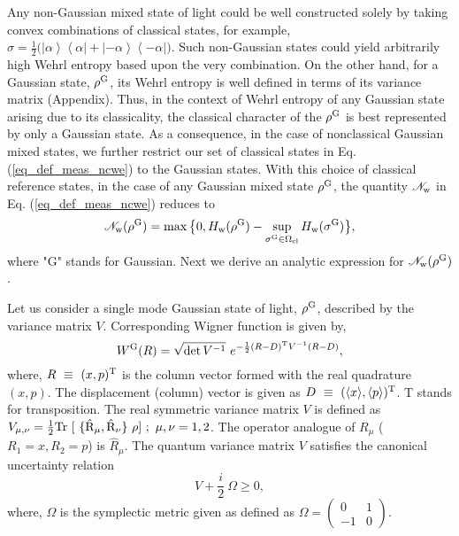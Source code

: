\documentclass[letter,scriptaddress,twocolumn,prl,showkeys]{revtex4}
\newcommand{\ket}[1]{\left| #1 \right\rangle}
\newcommand{\bra}[1]{\left\langle #1 \right|}
\begin{document}
Any non-Gaussian mixed state of light could be well constructed solely by taking convex combinations of classical states, for example, $\sigma=\frac{1}{2}\big(\ket\alpha\bra\alpha+\ket {-\alpha}\bra {-\alpha}\big)$. 
Such non-Gaussian states could yield arbitrarily high Wehrl entropy based upon the very combination. 
On the other hand, for a Gaussian state, $\rho^{\rm{G}}$, its Wehrl entropy is well defined in terms of its variance matrix (Appendix). 
Thus, in the context of Wehrl entropy of any Gaussian state arising due to its classicality, the classical character of the $\rho^{\rm{G}}$ is best represented by only a Gaussian state. 
As a consequence, in the case of nonclassical Gaussian mixed states, we further restrict our set of classical states in Eq. (\ref{eq_def_meas_ncwe}) to the Gaussian states. 
With this choice of classical reference states, in the case of any Gaussian mixed state $\rho^{\rm{G}}$, the quantity $\mathscr{N}_{\rm{w}}$ in Eq. (\ref{eq_def_meas_ncwe}) reduces to
\begin{equation}
\mathscr{N}_{\rm{w}}(\rho^{\rm{G}})=\max\big\lbrace 0,H_{\rm{w}}(\rho^{\rm{G}})-\sup_{\sigma^{\rm{G}}\in\Omega_{\rm{cl}}}H_{\rm{w}}(\sigma^{\rm{G}})\big\rbrace,
\label{eq_def_meas_ncwe_gauss}
\end{equation}
where "G" stands for Gaussian. 
Next we derive an analytic expression for $\mathscr{N}_{\rm{w}}(\rho^{\rm{G}})$.

Let us consider a single mode Gaussian state of light, $\rho^{\rm{G}}$, described by the variance matrix $V$. 
Corresponding Wigner function is given by,
\begin{equation}
W^{\rm{G}}(R)=\sqrt{\det V^{-1}}~e^{-\frac{1}{2}(R-D)^{\rm{T}}V^{-1}(R-D)},
\label{eq_def_wig_gauss}
\end{equation}
where, $R~\equiv~(x,p)^{\rm{T}}$ is the column vector formed with the real quadrature $(x,p)$. 
The displacement (column) vector is given as $D~\equiv~ (\langle x\rangle,\langle p\rangle)^{\rm{T}}$.
T stands for transposition.
The real symmetric variance matrix $V$ is defined as $V_{\mu,\nu}=\frac{1}{2}\rm{Tr}~[~\lbrace \hat{R}_{\mu},\hat{R}_{\nu}\rbrace~ \rho]~;~\mu,\nu=1,2$.
The operator analogue of $R_{\mu}$ ($R_{1}=x,R_{2}=p$) is $\hat{R}_{\mu}$.
The quantum variance matrix $V$ satisfies the canonical uncertainty relation \cite{varmat_simon}
\begin{equation}
V + \frac{i}{2}~\Omega\geq 0,
\label{eq_vm_cond_bonafide}
\end{equation}
where, $\Omega$ is the symplectic metric given as
defined as $\Omega=\begin{pmatrix}
0 & 1\\
-1 & 0
\end{pmatrix}$.
\end{document}
